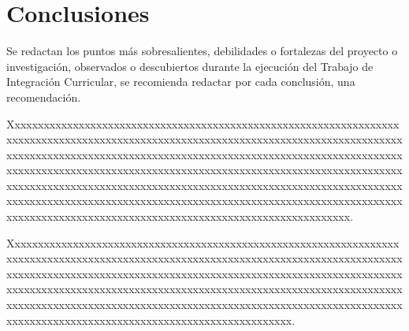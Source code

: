 \chapter*{Conclusiones}

Se redactan los puntos más sobresalientes, debilidades o fortalezas del proyecto o investigación, observados o descubiertos durante la ejecución del Trabajo de Integración Curricular, se recomienda redactar por cada conclusión, una recomendación.

Xxxxxxxxxxxxxxxxxxxxxxxxxxxxxxxxxxxxxxxxxxxxxxxxxxxxxxxxxxxxxxxxxxxxxxxxxxxxxxxxxxxxxxxxxxxxxxxxxxxxxxxxxxxxxxxxxxxxxxxxxxxxxxxxxxxxxxxxxxxxxxxxxxxxxxxxxxxxxxxxxxxxxxxxxxxxxxxxxxxxxxxxxxxxxxxxxxxxxxxxxxxxxxxxxxxxxxxxxxxxxxxxxxxxxxxxxxxxxxxxxxxxxxxxxxxxxxxxxxxxxxxxxxxxxxxxxxxxxxxxxxxxxxxxxxxxxxxxxxxxxxxxxxxxxxxxxxxxxxxxxxxxxxxxxxxxxxxxxxxxxxxxxxxxxxxxxxxxxxxxxxxxxxxxxxxxxxxxxxxxxxxxxxxxxxxxxxxxxxxxxxxxxxxxxxxxxxxxxxxxxxxxxxxxxxxxxxxxxxxxxxxxxxxxxxxxxxxxxxxxxxxxxx.

Xxxxxxxxxxxxxxxxxxxxxxxxxxxxxxxxxxxxxxxxxxxxxxxxxxxxxxxxxxxxxxxxxxxxxxxxxxxxxxxxxxxxxxxxxxxxxxxxxxxxxxxxxxxxxxxxxxxxxxxxxxxxxxxxxxxxxxxxxxxxxxxxxxxxxxxxxxxxxxxxxxxxxxxxxxxxxxxxxxxxxxxxxxxxxxxxxxxxxxxxxxxxxxxxxxxxxxxxxxxxxxxxxxxxxxxxxxxxxxxxxxxxxxxxxxxxxxxxxxxxxxxxxxxxxxxxxxxxxxxxxxxxxxxxxxxxxxxxxxxxxxxxxxxxxxxxxxxxxxxxxxxxxxxxxxxxxxxxxxxxxxxxxxxxxxxxxxxxxxxxxxxxxxxxxxxxxxxxxxxxxxxxxxxx.